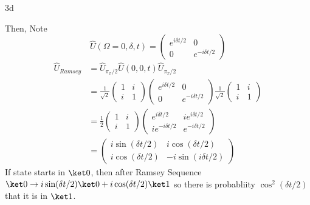 \documentclass[12pt]{article}
\begin{document}
\begin{exc}{3d}

\end{exc}
\begin{ans}
Then, 
Note 
\[\hat U(\Omega = 0,\delta,t) = \begin{pmatrix}
    e^{i\delta t/2} & 0 \\ 
    0 & e^{-i \delta t/2}
\end{pmatrix}\]
\begin{align*}
   \hat U_{Ramsey} &= \hat U_{\pi_x/2} \hat U(0, 0, t) \hat U_{\pi_x/2}\\ 
   &= \frac1{\sqrt 2}\begin{pmatrix}
        1 & i \\ i & 1
    \end{pmatrix}\begin{pmatrix}
       e^{i\delta t/2} & 0 \\
        0 & e^{-i\delta t/2}
    \end{pmatrix} \frac1{\sqrt 2}\begin{pmatrix}
        1 & i \\ i & 1
    \end{pmatrix}\\
    &= \frac12 \begin{pmatrix}
        1 & i \\ i & 1
    \end{pmatrix} \begin{pmatrix}
        e^{i\delta t/2} & i e^{i\delta t/2}\\
        i e^{-i\delta t/2} & e^{-i\delta t/2}
    \end{pmatrix}\\
    &= \begin{pmatrix}
       i \sin (\delta t/2) & i \cos(\delta t/2)\\ 
       i \cos(\delta t/2) & -i\sin(i \delta t/2) 
    \end{pmatrix}
\end{align*}
If state starts in $\ket 0 $, then after Ramsey Sequence $\ket 0 \to i \sin (\delta t/2)\ket 0 + i \cos(\delta t/2)\ket 1$ so there is probabliity $\cos^2(\delta t/2)$ that it is in $\ket 1$.


\end{ans}
\end{document}

